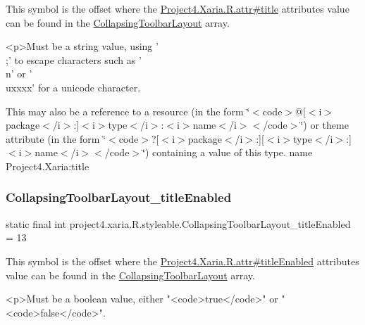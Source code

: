 This symbol is the offset where the \hyperlink{}{Project4.\+Xaria.\+R.\+attr\#title} attribute\textquotesingle{}s value can be found in the \hyperlink{classproject4_1_1xaria_1_1R_1_1styleable_ac131ed2b7e0e7f05b58231242478b839}{Collapsing\+Toolbar\+Layout} array.

\begin{DoxyVerb}      <p>Must be a string value, using '\\;' to escape characters such as '\\n' or '\\uxxxx' for a unicode character.
\end{DoxyVerb}
 

This may also be a reference to a resource (in the form \char`\"{}$<$code$>$@\mbox{[}$<$i$>$package$<$/i$>$\+:\mbox{]}$<$i$>$type$<$/i$>$\+:$<$i$>$name$<$/i$>$$<$/code$>$\char`\"{}) or theme attribute (in the form \char`\"{}$<$code$>$?\mbox{[}$<$i$>$package$<$/i$>$\+:\mbox{]}\mbox{[}$<$i$>$type$<$/i$>$\+:\mbox{]}$<$i$>$name$<$/i$>$$<$/code$>$\char`\"{}) containing a value of this type.  name Project4.\+Xaria\+:title \mbox{\label{classproject4_1_1xaria_1_1R_1_1styleable_a936dff2d19d66a8cbd916542670a8ce1}} 
\subsubsection{\texorpdfstring{Collapsing\+Toolbar\+Layout\+\_\+title\+Enabled}{CollapsingToolbarLayout\_titleEnabled}}
{\footnotesize\ttfamily static final int project4.\+xaria.\+R.\+styleable.\+Collapsing\+Toolbar\+Layout\+\_\+title\+Enabled = 13\hspace{0.3cm}{\ttfamily [static]}}

This symbol is the offset where the \hyperlink{}{Project4.\+Xaria.\+R.\+attr\#title\+Enabled} attribute\textquotesingle{}s value can be found in the \hyperlink{classproject4_1_1xaria_1_1R_1_1styleable_ac131ed2b7e0e7f05b58231242478b839}{Collapsing\+Toolbar\+Layout} array.

\begin{DoxyVerb}      <p>Must be a boolean value, either "<code>true</code>" or "<code>false</code>".
\end{DoxyVerb}
 


